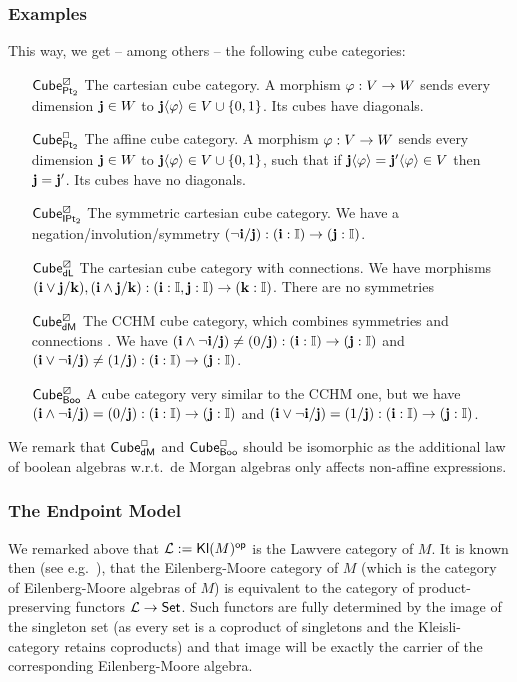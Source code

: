 \documentclass[a4paper]{article}
\begin{document}
\subsubsection{Examples}
This way, we get -- among others -- the following cube categories:
\begin{enumerate}
	\item[${\mathsf{Cube}}^\boxslash_{{\mathsf{Pt}_2}}$] The cartesian cube category.
	A morphism $\varphi : V \to W$ sends every dimension $\mathbf{j} \in W$ to $\mathbf{j} \langle \varphi \rangle \in V \cup \mathopen{}\left\{ 0, 1 \right\}\mathclose{}$.
	Its cubes have diagonals.
	\item[${\mathsf{Cube}}^\Box_{{\mathsf{Pt}_2}}$] The affine cube category.
	A morphism $\varphi : V \to W$ sends every dimension $\mathbf{j} \in W$ to $\mathbf{j} \langle \varphi \rangle \in V \cup \mathopen{}\left\{ 0, 1 \right\}\mathclose{}$, such that if $\mathbf{j}\langle \varphi \rangle = \mathbf{j}' \langle \varphi \rangle \in V$ then $\mathbf{j} = \mathbf{j}'$.
	Its cubes have no diagonals.
	\item[${\mathsf{Cube}}^\boxslash_{{\mathsf{IPt}_2}}$] The symmetric cartesian cube category. We have a negation/involution/symmetry $(\lnot \mathbf{i} / \mathbf{j}) : (\mathbf{i} : {\mathbb I}) \to (\mathbf{j} : {\mathbb I})$.
	\item[${\mathsf{Cube}}^\boxslash_{\mathsf{dL}}$] The cartesian cube category with connections. We have morphisms $(\mathbf{i} \vee \mathbf{j} / \mathbf{k}), (\mathbf{i} \wedge \mathbf{j} / \mathbf{k}) : (\mathbf{i} : {\mathbb I}, \mathbf{j} : {\mathbb I}) \to (\mathbf{k} : {\mathbb I})$. There are no symmetries
	\item[${\mathsf{Cube}}^\boxslash_{\mathsf{dM}}$] The CCHM cube category, which combines symmetries and connections \cite{cubical}. We have $(\mathbf{i} \wedge \lnot \mathbf{i} / \mathbf{j}) \neq (0/\mathbf{j}) : (\mathbf{i} : {\mathbb I}) \to (\mathbf{j} : {\mathbb I})$ and $(\mathbf{i} \vee \lnot \mathbf{i} / \mathbf{j}) \neq (1/\mathbf{j}) : (\mathbf{i} : {\mathbb I}) \to (\mathbf{j} : {\mathbb I})$.
	\item[${\mathsf{Cube}}^\boxslash_{\mathsf{Boo}}$] A cube category very similar to the CCHM one, but we have $(\mathbf{i} \wedge \lnot \mathbf{i} / \mathbf{j}) = (0/\mathbf{j}) : (\mathbf{i} : {\mathbb I}) \to (\mathbf{j} : {\mathbb I})$ and $(\mathbf{i} \vee \lnot \mathbf{i} / \mathbf{j}) = (1/\mathbf{j}) : (\mathbf{i} : {\mathbb I}) \to (\mathbf{j} : {\mathbb I})$.
\end{enumerate}
We remark that ${\mathsf{Cube}}^\Box_{\mathsf{dM}}$ and ${\mathsf{Cube}}^\Box_{\mathsf{Boo}}$ should be isomorphic as the additional law of boolean algebras w.r.t.\ de Morgan algebras only affects non-affine expressions.

\subsubsection{The Endpoint Model}
We remarked above that ${\mathcal L} := {\mathsf{Kl}}(M)^{\mathsf{op}}$ is the Lawvere category of $M$.
It is known then (see e.g.\ \cite{keml-diagrams}), that the Eilenberg-Moore category of $M$ (which is the category of Eilenberg-Moore algebras of $M$) is equivalent to the category of product-preserving functors ${\mathcal L} \to {\mathsf{Set}}$.
Such functors are fully determined by the image of the singleton set (as every set is a coproduct of singletons and the Kleisli-category retains coproducts) and that image will be exactly the carrier of the corresponding Eilenberg-Moore algebra.
\end{document}
